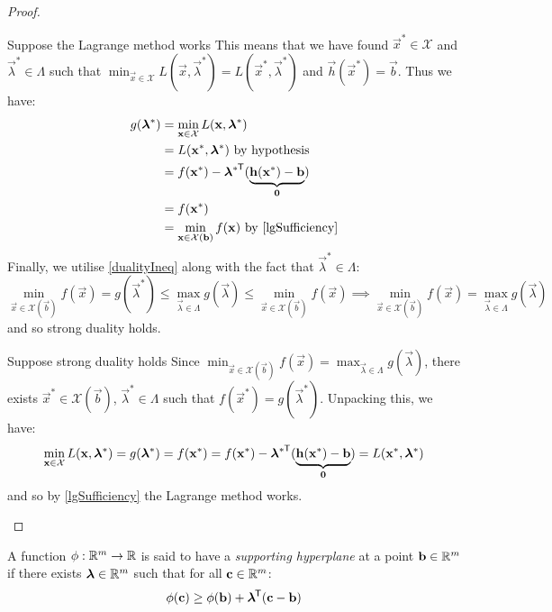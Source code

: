 \documentclass[../main.tex]{subfiles}
\begin{document}
\begin{proof}
  \begin{proofdirection}{Suppose the Lagrange method works}
    This means that we have found $\vec{x}^{*} \in \mathcal{X}$ and $\vec{\lambda}^{*} \in \Lambda$ such that $\min_{\vec{x} \in \mathcal{X}} L(\vec{x}, \vec{\lambda}^{*}) = L(\vec{x}^{*}, \vec{\lambda}^{*})$ and $\vec{h}(\vec{x}^{*}) = \vec{b}$.
    Thus we have:
    \begin{align*}
      g(\vec{\lambda}^{*}) &= \min_{\vec{x} \in \mathcal{X}} L(\vec{x}, \vec{\lambda}^{*}) \\
                           &= L(\vec{x}^{*}, \vec{\lambda}^{*}) \text{ by hypothesis} \\
                           &= f(\vec{x}^{*}) - {\vec{\lambda}^{*}}^{\trans}(\underbrace{\vec{h}(\vec{x}^{*}) - \vec{b}}_{\vec{0}}) \\
                           &= f(\vec{x}^{*}) \\
                           &= \min_{\vec{x} \in \mathcal{X}(\vec{b})} f(\vec{x}) \text{ by \cref{lgSufficiency}}
    \end{align*}
    Finally, we utilise \cref{dualityIneq} along with the fact that $\vec{\lambda}^{*} \in \Lambda$:
    \[
      \min_{\vec{x} \in \mathcal{X}(\vec{b})} f(\vec{x}) = g(\vec{\lambda}^{*}) \leq \max_{\vec{\lambda} \in \Lambda} g(\vec{\lambda}) \leq \min_{\vec{x} \in \mathcal{X}(\vec{b})} f(\vec{x}) \implies \min_{\vec{x} \in \mathcal{X}(\vec{b})} f(\vec{x}) = \max_{\vec{\lambda} \in \Lambda} g(\vec{\lambda})
    \]
    and so strong duality holds.
  \end{proofdirection}
  \begin{proofdirection}{Suppose strong duality holds}
    Since $\min_{\vec{x} \in \mathcal{X}(\vec{b})} f(\vec{x}) = \max_{\vec{\lambda} \in \Lambda} g(\vec{\lambda})$, there exists $\vec{x}^{*} \in \mathcal{X}(\vec{b})$, $\vec{\lambda}^{*} \in \Lambda$ such that $f(\vec{x}^{*}) = g(\vec{\lambda}^{*})$.
    Unpacking this, we have:
    \[
       \min_{\mathbf{\bm{x}} \in \mathcal{X}} L(\mathbf{\bm{x}}, \mathbf{\bm{\lambda}}^{*}) = g(\mathbf{\bm{\lambda}}^{*}) = f(\mathbf{\bm{x}}^{*}) = f(\mathbf{\bm{x}}^{*}) - {\mathbf{\bm{\lambda}}^{*}}^{{\mkern-1.5mu\mathsf{T}}}(\underbrace{\mathbf{\bm{h}}(\mathbf{\bm{x}}^{*}) - \mathbf{\bm{b}}}_{\mathbf{\bm{0}}}) = L(\mathbf{\bm{x}}^{*}, \mathbf{\bm{\lambda}}^{*})
    \]
    and so by \cref{lgSufficiency} the Lagrange method works.
  \end{proofdirection}
\end{proof}
\begin{definition}
  A function $\phi: \mathbb{R}^{m} \to \mathbb{R}$ is said to have a \textit{supporting hyperplane} at a point $\mathbf{\bm{b}} \in \mathbb{R}^{m}$ if there exists $\mathbf{\bm{\lambda}} \in \mathbb{R}^{m}$ such that for all $\mathbf{\bm{c}} \in \mathbb{R}^{m}$:
  \[
    \phi(\mathbf{\bm{c}}) \geq \phi(\mathbf{\bm{b}}) + \mathbf{\bm{\lambda}}^{{\mkern-1.5mu\mathsf{T}}}(\mathbf{\bm{c}} - \mathbf{\bm{b}})
  \]
\end{definition}
\end{document}
